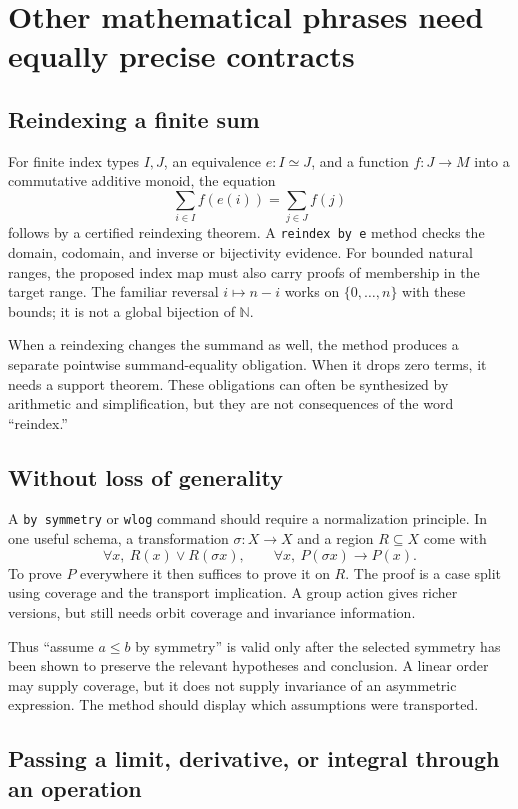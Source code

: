 \documentclass[11pt,a4paper]{article}
\newcommand{\N}{\mathbb N}
\newcommand{\code}[1]{\texttt{#1}}
\theoremstyle{remark}
\begin{document}
\section{Other mathematical phrases need equally precise contracts}
\label{sec:other-methods}

\subsection{Reindexing a finite sum}

For finite index types $I,J$, an equivalence $e:I\simeq J$, and a function $f:J\to M$ into a commutative additive monoid, the equation
\[
\sum_{i\in I}f(e(i))=\sum_{j\in J}f(j)
\]
follows by a certified reindexing theorem. A \code{reindex by e} method checks the domain, codomain, and inverse or bijectivity evidence. For bounded natural ranges, the proposed index map must also carry proofs of membership in the target range. The familiar reversal $i\mapsto n-i$ works on $\{0,\ldots,n\}$ with these bounds; it is not a global bijection of $\N$.

When a reindexing changes the summand as well, the method produces a separate pointwise summand-equality obligation. When it drops zero terms, it needs a support theorem. These obligations can often be synthesized by arithmetic and simplification, but they are not consequences of the word ``reindex.''

\subsection{Without loss of generality}

A \code{by symmetry} or \code{wlog} command should require a normalization principle. In one useful schema, a transformation $\sigma:X\to X$ and a region $R\subseteq X$ come with
\[
\forall x,\ R(x)\lor R(\sigma x),
\qquad
\forall x,\ P(\sigma x)\to P(x).
\]
To prove $P$ everywhere it then suffices to prove it on $R$. The proof is a case split using coverage and the transport implication. A group action gives richer versions, but still needs orbit coverage and invariance information.

Thus ``assume $a\le b$ by symmetry'' is valid only after the selected symmetry has been shown to preserve the relevant hypotheses and conclusion. A linear order may supply coverage, but it does not supply invariance of an asymmetric expression. The method should display which assumptions were transported.

\subsection{Passing a limit, derivative, or integral through an operation}
\end{document}
